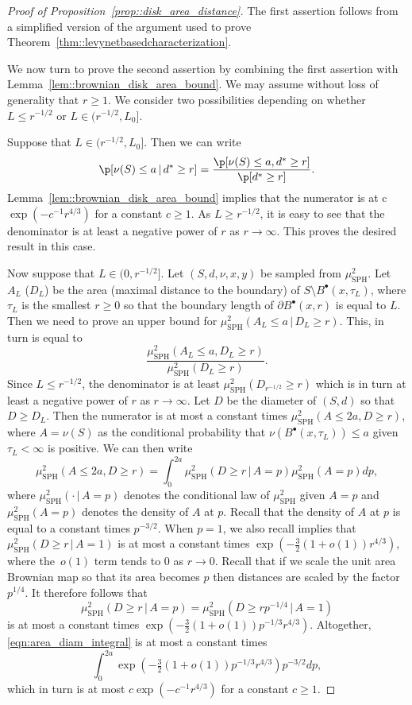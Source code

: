 \documentclass[10pt]{amsart}
\newcommand{\sbullet}{{\scriptscriptstyle\bullet}}
\theoremstyle{plain}
\numberwithin{theorem}{section}
\theoremstyle{definition}
\newcommand{\mustwo}{\mu_{\mathrm{SPH}}^2}
\newcommand{\giv}{\,|\,}
\newcommand{\fb}[2]{B^\sbullet(#1,#2)}
\begin{document}
\begin{proof}[Proof of Proposition~\ref{prop::disk_area_distance}]
The first assertion follows from a simplified version of the argument used to prove Theorem~\ref{thm::levynetbasedcharacterization}.

We now turn to prove the second assertion by combining the first assertion with Lemma~\ref{lem::brownian_disk_area_bound}. We may assume without loss of generality that $r \geq 1$. We consider two possibilities depending on whether $L \leq r^{-1/2}$ or $L \in (r^{-1/2}, L_0]$.

Suppose that $L \in (r^{-1/2},L_0]$. Then we can write
\[
\p[ \nu(S) \leq a \giv d^* \geq r] = \frac{\p[ \nu(S) \leq a, d^* \geq r]}{\p[d^* \geq r]}.
\]
Lemma~\ref{lem::brownian_disk_area_bound} implies that the numerator is at c $\exp(-c^{-1} r^{4/3})$ for a constant $c \geq 1$. As $L \geq r^{-1/2}$, it is easy to see that the denominator is at least a negative power of $r$ as $r \to \infty$. This proves the desired result in this case.

Now suppose that $L \in (0,r^{-1/2}]$. Let $(S,d,\nu,x,y)$ be sampled from $\mustwo$. Let $A_L$ (\resp $D_L$) be the area (\resp maximal distance to the boundary) of $S \setminus \fb{x}{\tau_L}$, where $\tau_L$ is the smallest $r \geq 0$ so that the boundary length of $\partial \fb{x}{r}$ is equal to $L$. Then we need to prove an upper bound for $\mustwo(A_L \leq a \giv D_L \geq r)$. This, in turn is equal to
\[
\frac{\mustwo(A_L \leq a, D_L \geq r)}{\mustwo(D_L \geq r)}.
\]
Since $L \leq r^{-1/2}$, the denominator is at least $\mustwo(D_{r^{-1/2}} \geq r)$ which is in turn at least a negative power of $r$ as $r \to \infty$. Let $D$ be the diameter of $(S,d)$ so that $D \geq D_L$. Then the numerator is at most a constant times $\mustwo(A \leq 2a, D \geq r)$, where $A = \nu(S)$ as the conditional probability that $\nu(\fb{x}{\tau_L}) \leq a$ given $\tau_L < \infty$ is positive. We can then write
\begin{equation}
\label{eqn:area_diam_integral}	
\mustwo(A \leq 2a, D \geq r) = \int_0^{2a} \mustwo(D \geq r \giv A = p) \mustwo(A = p) dp,
\end{equation}
where $\mustwo( \cdot \giv A\!=\!p)$ denotes the conditional law of $\mustwo$ given $A\!=\!p$ and \hbox{$\mustwo(A\!=\!p)$} denotes the density of $A$ at $p$. Recall that the density of $A$ at $p$ is equal to a constant times $p^{-3/2}$. When $p=1$, we also recall \cite[Prop.\,14]{serlet_ldp} implies that \hbox{$\mustwo(D \geq r \giv A = 1)$} is at most a constant times $\exp(-\tfrac{3}{2}(1+o(1)) r^{4/3})$, where the~$o(1)$ term tends to $0$ as $r \to 0$. Recall that if we scale the unit area Brownian map so that its area becomes $p$ then distances are scaled by the factor $p^{1/4}$. It therefore follows that
\[
\mustwo(D \geq r \giv A = p) = \mustwo(D \geq r p^{-1/4} \giv A = 1)
\]
is at most a constant times $\exp(-\tfrac{3}{2}(1+o(1)) p^{-1/3} r^{4/3})$. Altogether, \eqref{eqn:area_diam_integral} is at most a constant times
\[
\int_0^{2a} \exp(-\tfrac{3}{2}(1+o(1)) p^{-1/3} r^{4/3}) p^{-3/2} dp,
\]
which in turn is at most $c \exp(-c^{-1} r^{4/3})$ for a constant $c \geq 1$.
\end{proof}
\end{document}
